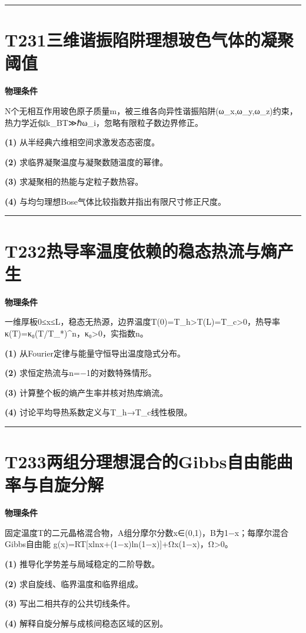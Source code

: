 \documentclass[UTF8,a4paper,11pt,oneside,openany]{ctexbook}
\begin{document}
\par\bigskip\hrule\bigskip
\section*{T231\quad 三维谐振陷阱理想玻色气体的凝聚阈值}
\textbf{物理条件}\par N个无相互作用玻色原子质量m，被三维各向异性谐振陷阱(ω\_x,ω\_y,ω\_z)约束，热力学近似k\_BT≫ℏω\_i，忽略有限粒子数边界修正。
\par\noindent\textbf{(1)} 从半经典六维相空间求激发态态密度。
\par\noindent\textbf{(2)} 求临界凝聚温度与凝聚数随温度的幂律。
\par\noindent\textbf{(3)} 求凝聚相的热能与定粒子数热容。
\par\noindent\textbf{(4)} 与均匀理想Bose气体比较指数并指出有限尺寸修正尺度。

\par\bigskip\hrule\bigskip
\section*{T232\quad 热导率温度依赖的稳态热流与熵产生}
\textbf{物理条件}\par 一维厚板0≤x≤L，稳态无热源，边界温度T(0)=T\_h>T(L)=T\_c>0，热导率κ(T)=κ₀(T/T\_*)\textasciicircum{}n，κ₀>0，实指数n。
\par\noindent\textbf{(1)} 从Fourier定律与能量守恒导出温度隐式分布。
\par\noindent\textbf{(2)} 求恒定热流与n=−1的对数特殊情形。
\par\noindent\textbf{(3)} 计算整个板的熵产生率并核对热库熵流。
\par\noindent\textbf{(4)} 讨论平均导热系数定义与T\_h→T\_c线性极限。

\par\bigskip\hrule\bigskip
\section*{T233\quad 两组分理想混合的Gibbs自由能曲率与自旋分解}
\textbf{物理条件}\par 固定温度T的二元晶格混合物，A组分摩尔分数x∈(0,1)，B为1−x；每摩尔混合Gibbs自由能 g(x)=RT[xlnx+(1−x)ln(1−x)]+Ωx(1−x)，Ω>0。
\par\noindent\textbf{(1)} 推导化学势差与局域稳定的二阶导数。
\par\noindent\textbf{(2)} 求自旋线、临界温度和临界组成。
\par\noindent\textbf{(3)} 写出二相共存的公共切线条件。
\par\noindent\textbf{(4)} 解释自旋分解与成核间稳态区域的区别。
\end{document}
